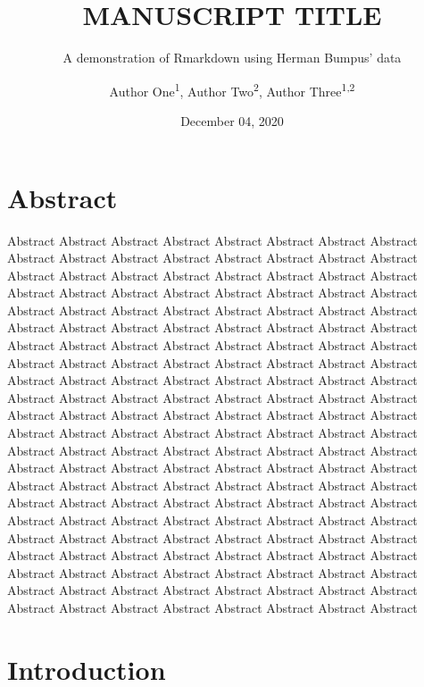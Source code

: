 \documentclass[
]{article}
\title{MANUSCRIPT TITLE}
\subtitle{A demonstration of Rmarkdown using Herman Bumpus' data}
\author{Author One\textsuperscript{1},
Author Two\textsuperscript{2},
Author Three\textsuperscript{1,2}}
\date{December 04, 2020}
\begin{document}
\maketitle


\hypertarget{abstract}{%
\section{Abstract}\label{abstract}}

Abstract Abstract Abstract Abstract Abstract Abstract Abstract Abstract Abstract Abstract Abstract Abstract Abstract Abstract Abstract Abstract Abstract Abstract Abstract Abstract Abstract Abstract Abstract Abstract Abstract Abstract Abstract Abstract Abstract Abstract Abstract Abstract Abstract Abstract Abstract Abstract Abstract Abstract Abstract Abstract Abstract Abstract Abstract Abstract Abstract Abstract Abstract Abstract Abstract Abstract Abstract Abstract Abstract Abstract Abstract Abstract Abstract Abstract Abstract Abstract Abstract Abstract Abstract Abstract Abstract Abstract Abstract Abstract Abstract Abstract Abstract Abstract Abstract Abstract Abstract Abstract Abstract Abstract Abstract Abstract Abstract Abstract Abstract Abstract Abstract Abstract Abstract Abstract Abstract Abstract Abstract Abstract Abstract Abstract Abstract Abstract Abstract Abstract Abstract Abstract Abstract Abstract Abstract Abstract Abstract Abstract Abstract Abstract Abstract Abstract Abstract Abstract Abstract Abstract Abstract Abstract Abstract Abstract Abstract Abstract Abstract Abstract Abstract Abstract Abstract Abstract Abstract Abstract Abstract Abstract Abstract Abstract Abstract Abstract Abstract Abstract Abstract Abstract Abstract Abstract Abstract Abstract Abstract Abstract Abstract Abstract Abstract Abstract Abstract Abstract Abstract Abstract Abstract Abstract Abstract Abstract Abstract Abstract Abstract Abstract Abstract Abstract Abstract Abstract Abstract Abstract Abstract Abstract Abstract Abstract Abstract Abstract Abstract Abstract Abstract Abstract

\clearpage

\hypertarget{introduction}{%
\section{Introduction}\label{introduction}}
\end{document}
